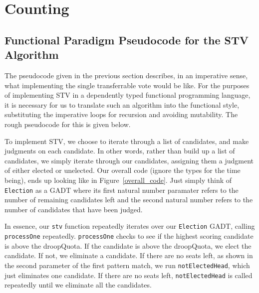 \section{Counting}

\subsection{Functional Paradigm Pseudocode for the STV Algorithm}

The pseudocode given in the previous section describes, in an imperative sense,
what implementing the single transferrable vote would be like. For the purposes
of implementing STV in a dependently typed functional programming language, it
is necessary for us to translate such an algorithm into the functional style,
substituting the imperative loops for recursion and avoiding mutability. The
rough pseudocode for this is given below. 

\begin{algorithm}
\end{algorithm}

To implement STV, we choose to iterate through a list of candidates, and make
judgments on each candidate. In other words, rather than build up a list of
candidates, we simply iterate through our candidates, assigning them a judgment
of either elected or unelected. Our overall code (ignore the types for the time
being), ends up looking like in Figure~\ref{overall_code}. Just simply think of
\texttt{Election} as a GADT where its first natural number paramater refers to
the number of remaining candidates left and the second natural number refers to
the number of candidates that have been judged. 

In essence, our \texttt{stv} function repeatedly iterates over our
\texttt{Election} GADT, calling \texttt{processOne} repeatedly.
\texttt{processOne} checks to see if the highest scoring candidate is above the
droopQuota. If the candidate is above the droopQuota, we elect the candidate. If
not, we eliminate a candidate. If there are no seats left, as shown in the
second parameter of the first pattern match, we run \texttt{notElectedHead},
which just eliminates one candidate. If there are no seats left,
\texttt{notElectedHead} is called repeatedly until we eliminate all the
candidates. 

